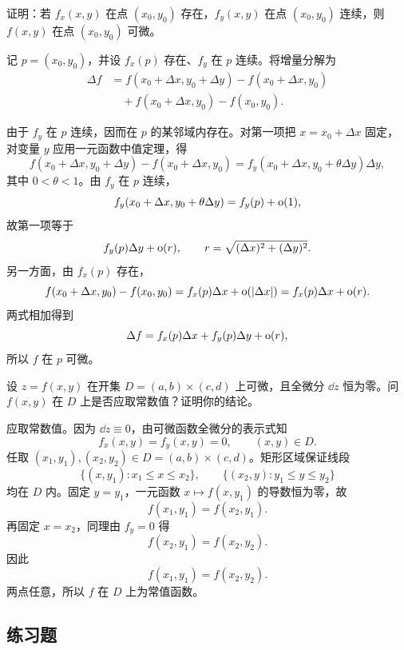 \begin{xthought}[4]
证明：若 $f_x(x,y)$ 在点 $(x_0,y_0)$ 存在，$f_y(x,y)$ 在点 $(x_0,y_0)$ 连续，则 $f(x,y)$ 在点 $(x_0,y_0)$ 可微。
\end{xthought}
\begin{xsolution}
记 $p=(x_0,y_0)$，并设 $f_x(p)$ 存在、$f_y$ 在 $p$ 连续。将增量分解为
\begin{align*}
  \Delta f
  &=f(x_0+\Delta x,y_0+\Delta y)-f(x_0+\Delta x,y_0)\\
  &\quad+f(x_0+\Delta x,y_0)-f(x_0,y_0).
\end{align*}

由于 $f_y$ 在 $p$ 连续，因而在 $p$ 的某邻域内存在。对第一项把 $x=x_0+\Delta x$ 固定，对变量 $y$ 应用一元函数中值定理，得
\[
  f(x_0+\Delta x,y_0+\Delta y)-f(x_0+\Delta x,y_0)
  =f_y(x_0+\Delta x,y_0+\theta\Delta y)\Delta y,
\]
其中 $0<\theta<1$。由 $f_y$ 在 $p$ 连续，
\[
  f_y(x_0+\Delta x,y_0+\theta\Delta y)
  =f_y(p)+\mathrm{o}(1),
\]
故第一项等于
\[
  f_y(p)\Delta y+\mathrm{o}(r),
  \qquad r=\sqrt{(\Delta x)^2+(\Delta y)^2}.
\]
另一方面，由 $f_x(p)$ 存在，
\[
  f(x_0+\Delta x,y_0)-f(x_0,y_0)
  =f_x(p)\Delta x+\mathrm{o}(|\Delta x|)
  =f_x(p)\Delta x+\mathrm{o}(r).
\]
两式相加得到
\[
  \Delta f=f_x(p)\Delta x+f_y(p)\Delta y+\mathrm{o}(r),
\]
所以 $f$ 在 $p$ 可微。
\end{xsolution}


\begin{xthought}[5]
设 $z=f(x,y)$ 在开集 $D=(a,b)\times(c,d)$ 上可微，且全微分 $\dd z$ 恒为零。问 $f(x,y)$ 在 $D$ 上是否应取常数值？证明你的结论。
\end{xthought}
\begin{xsolution}
应取常数值。因为 $\dd z\equiv0$，由可微函数全微分的表示式知
\[
  f_x(x,y)=f_y(x,y)=0,
  \qquad (x,y)\in D.
\]
任取 $(x_1,y_1),(x_2,y_2)\in D=(a,b)\times(c,d)$。矩形区域保证线段
\[
  \{(x,y_1):x_1\le x\le x_2\},
  \qquad
  \{(x_2,y):y_1\le y\le y_2\}
\]
均在 $D$ 内。固定 $y=y_1$，一元函数 $x\mapsto f(x,y_1)$ 的导数恒为零，故
\[
  f(x_1,y_1)=f(x_2,y_1).
\]
再固定 $x=x_2$，同理由 $f_y=0$ 得
\[
  f(x_2,y_1)=f(x_2,y_2).
\]
因此
\[
  f(x_1,y_1)=f(x_2,y_2).
\]
两点任意，所以 $f$ 在 $D$ 上为常值函数。
\end{xsolution}


\subsection{练习题}

